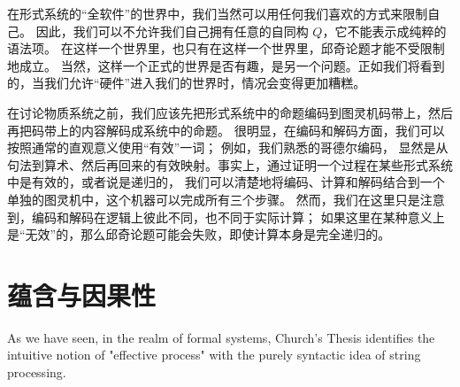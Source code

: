 \documentclass[a4paper,12pt]{article}
\begin{document}
在形式系统的“全软件”的世界中，我们当然可以用任何我们喜欢的方式来限制自己。
因此，我们可以不允许我们自己拥有任意的自同构 $Q$，它不能表示成纯粹的语法项。
在这样一个世界里，也只有在这样一个世界里，邱奇论题才能不受限制地成立。
当然，这样一个正式的世界是否有趣，是另一个问题。正如我们将看到的，当我们允许“硬件”进入我们的世界时，情况会变得更加糟糕。

在讨论物质系统之前，我们应该先把形式系统中的命题编码到图灵机码带上，然后再把码带上的内容解码成系统中的命题。
很明显，在编码和解码方面，我们可以按照通常的直观意义使用“有效”一词； 例如，我们熟悉的哥德尔编码，
显然是从句法到算术、然后再回来的有效映射。事实上，通过证明一个过程在某些形式系统中是有效的，或者说是递归的，
我们可以清楚地将编码、计算和解码结合到一个单独的图灵机中，这个机器可以完成所有三个步骤。
然而，我们在这里只是注意到，编码和解码在逻辑上彼此不同，也不同于实际计算；
如果这里在某种意义上是“无效”的，那么邱奇论题可能会失败，即使计算本身是完全递归的。

\section{蕴含与因果性}

As we have seen, in the realm of formal systems, Church's Thesis identifies the intuitive notion of "effective process" with the purely syntactic idea of string processing.
\end{document}
